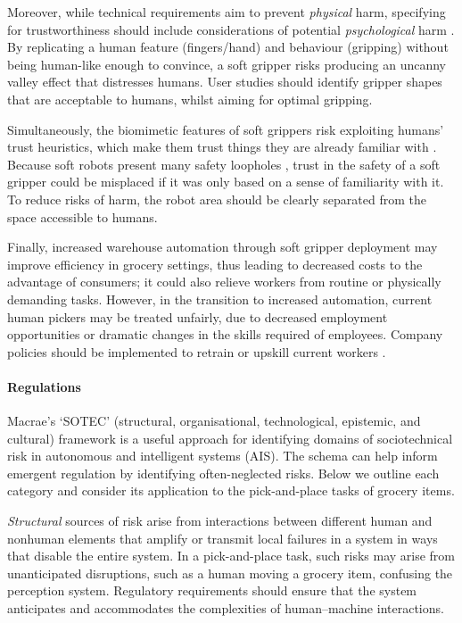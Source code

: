 \documentclass[lettersize,journal]{IEEEtran}
\begin{document}
Moreover, while technical requirements aim to prevent \emph{physical} harm, specifying for trustworthiness should include considerations of potential \emph{psychological} harm \cite{Porter2022}. By replicating a human feature (fingers/hand) and behaviour (gripping) without being human-like enough to convince, a soft gripper risks producing an uncanny valley effect \cite{moore2012bayesian} that distresses humans. User studies should identify gripper shapes that are acceptable to humans, whilst aiming for optimal gripping.  
	
 
Simultaneously, the biomimetic features of soft grippers risk exploiting humans’ trust heuristics, which make them trust things they are already familiar with \cite{Manzini}. Because soft robots present many safety loopholes \cite{abidi2017intrinsic}, trust in the safety of a soft gripper could be misplaced if it was only based on a sense of familiarity with it. To reduce risks of harm, the robot area should be clearly separated from the space accessible to humans.

 
Finally, increased warehouse automation through soft gripper deployment may improve efficiency in grocery settings, thus leading to decreased costs to the advantage of consumers; it could also relieve workers from routine or physically demanding tasks. However, in the transition to increased automation, current human pickers may be treated unfairly, due to decreased employment opportunities or dramatic changes in the skills required of employees. Company policies should be implemented to retrain or upskill current workers \cite{georgieff2021happened}.
\\


\paragraph{Regulations}\label{regulation}

Macrae’s \cite{Macrae2022} ‘SOTEC’ (structural, organisational, technological, epistemic, and cultural) framework is a useful approach for identifying domains of sociotechnical risk in autonomous and intelligent systems (AIS). The schema can help inform emergent regulation by identifying often-neglected risks. Below we outline each category and consider its application to the pick-and-place tasks of grocery items.

\emph{Structural} sources of risk arise from interactions between different human and nonhuman elements that amplify or transmit local failures in a system in ways that disable the entire system. In a pick-and-place task, such risks may arise from unanticipated disruptions, such as a human moving a grocery item, confusing the perception system. Regulatory requirements should ensure that the system anticipates and accommodates the complexities of human–machine interactions.
\end{document}
